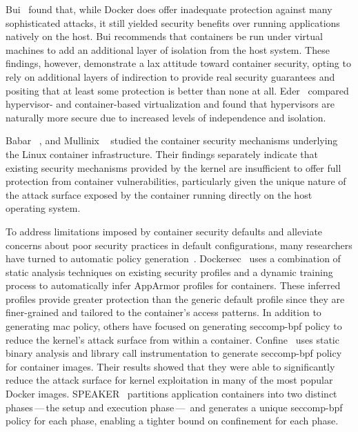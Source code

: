 Bui~\cite{bui2015_docker_analysis} found that, while Docker does offer inadequate
protection against many sophisticated attacks, it still yielded security benefits over
running applications natively on the host. Bui recommends that containers be run under
virtual machines to add an additional layer of isolation from the host system. These
findings, however, demonstrate a lax attitude toward container security, opting to rely on
additional layers of indirection to provide real security guarantees and positing that at
least some protection is better than none at all.
Eder~\cite{eder2016_hypervisor_container} compared hypervisor- and container-based
virtualization and found that hypervisors are naturally more secure due to increased
levels of independence and isolation.

Babar \etal~\cite{babar2017_understanding}, and Mullinix
\etal~\cite{mullinix2020_security_measures} studied the container security mechanisms
underlying the Linux container infrastructure. Their findings separately indicate that
existing security mechanisms provided by the kernel are insufficient to offer full
protection from container vulnerabilities, particularly given the unique nature of the
attack surface exposed by the container running directly on the host operating system.

To address limitations imposed by container security defaults and alleviate concerns about
poor security practices in default configurations, many researchers have turned to
automatic policy generation~\cite{loukidis2018_dockersec, ghavamania2020_confine,
lei2017_speaker}.  Dockersec~\cite{loukidis2018_dockersec} uses a combination of static
analysis techniques on existing security profiles and a dynamic training process to
automatically infer AppArmor profiles for containers.  These inferred profiles provide
greater protection than the generic default profile since they are finer-grained and
tailored to the container's access patterns. In addition to generating \gls{mac} policy,
others have focused on generating seccomp-bpf policy to reduce the kernel's attack surface
from within a container. Confine~\cite{ghavamania2020_confine} uses static binary analysis
and library call instrumentation to generate seccomp-bpf policy for container images.
Their results showed that they were able to significantly reduce the attack surface for
kernel exploitation in many of the most popular Docker images.
SPEAKER~\cite{lei2017_speaker} partitions application containers into two distinct
phases\,---\,the setup and execution phase\,---\, and generates a unique seccomp-bpf
policy for each phase, enabling a tighter bound on confinement for each phase.

